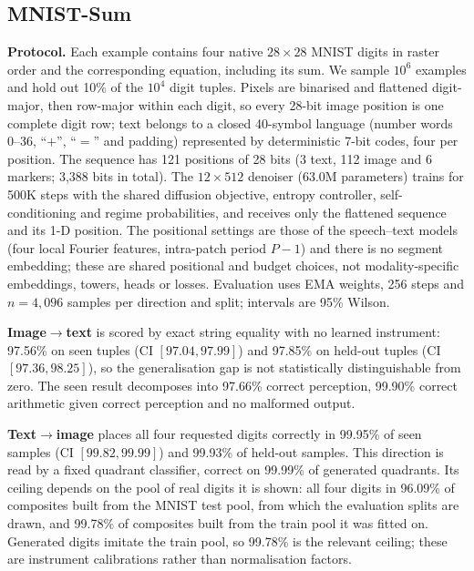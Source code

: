 \subsection{MNIST-Sum}
\label{app:image:mnist}

\textbf{Protocol.} Each example contains four native $28{\times}28$ MNIST digits in raster order
and the corresponding equation, including its sum. We sample $10^6$ examples and hold out 10\% of
the $10^4$ digit tuples. Pixels are binarised and flattened digit-major, then row-major within each
digit, so every 28-bit image position is one complete digit row; text belongs to a closed
40-symbol language (number words 0--36, ``$+$'', ``$=$'' and padding) represented by deterministic
7-bit codes, four per position. The sequence has 121 positions of 28 bits (3 text, 112 image and 6 markers; 3,388 bits in total).
The $12{\times}512$ denoiser (63.0M parameters) trains for 500K steps with the shared diffusion
objective, entropy controller, self-conditioning and regime probabilities, and receives only the
flattened sequence and its 1-D position. The positional settings are those of the speech--text
models (four local Fourier features, intra-patch period $P-1$) and there is no segment embedding;
these are shared positional and budget choices, not modality-specific embeddings, towers, heads or losses.
Evaluation uses EMA weights, 256 steps and $n{=}4{,}096$ samples per direction and split;
intervals are 95\% Wilson.

\textbf{Image$\rightarrow$text} is scored by exact string equality with no learned instrument:
97.56\% on seen tuples (CI $[97.04, 97.99]$) and 97.85\% on held-out tuples (CI
$[97.36, 98.25]$), so the generalisation gap is not statistically distinguishable from zero. The
seen result decomposes into 97.66\% correct perception, 99.90\% correct arithmetic given correct
perception and no malformed output.

\textbf{Text$\rightarrow$image} places all four requested digits correctly in 99.95\% of seen
samples (CI $[99.82, 99.99]$) and 99.93\% of held-out samples. This direction is read by a fixed
quadrant classifier, correct on 99.99\% of generated quadrants. Its ceiling depends on the pool of
real digits it is shown: all four digits in 96.09\% of composites built from the MNIST test pool,
from which the evaluation splits are drawn, and 99.78\% of composites built from the train pool it
was fitted on. Generated digits imitate the train pool, so 99.78\% is the relevant ceiling; these
are instrument calibrations rather than normalisation factors.

